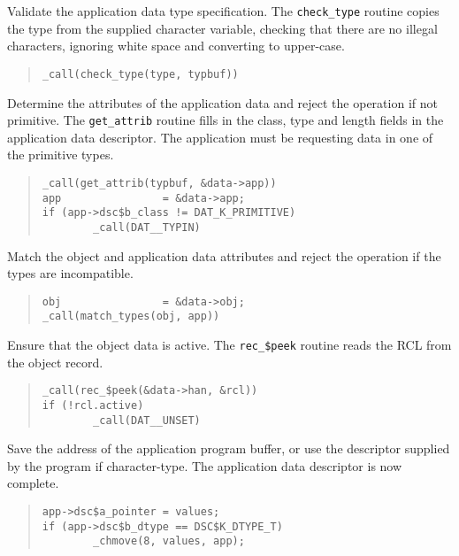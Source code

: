 Validate the application data type specification. The {\tt check\_type} routine
copies the type from the supplied character variable, checking that there are
no illegal characters, ignoring white space and converting to upper-case.

\begin {quote}
\begin {verbatim}
_call(check_type(type, typbuf))
\end{verbatim}
\end {quote}

Determine the attributes of the application data and reject the operation if
not primitive. The {\tt get\_attrib} routine fills in the class, type and length
fields in the application data descriptor. The application must be requesting
data in one of the primitive types.

\begin {quote}
\begin {verbatim}
_call(get_attrib(typbuf, &data->app))
app                = &data->app;
if (app->dsc$b_class != DAT_K_PRIMITIVE)
        _call(DAT__TYPIN)
\end{verbatim}
\end {quote}

Match the object and application data attributes and reject the operation if
the types are incompatible.

\begin {quote}
\begin {verbatim}
obj                = &data->obj;
_call(match_types(obj, app))
\end{verbatim}
\end {quote}

Ensure that the object data is active. The {\tt rec\_\$peek} routine reads the
RCL from the object record.

\begin {quote}
\begin {verbatim}
_call(rec_$peek(&data->han, &rcl))
if (!rcl.active)
        _call(DAT__UNSET)
\end{verbatim}
\end {quote}

Save the address of the application program buffer, or use the descriptor
supplied by the program if character-type. The application data descriptor is
now complete.

\begin {quote}
\begin {verbatim}
app->dsc$a_pointer = values;
if (app->dsc$b_dtype == DSC$K_DTYPE_T)
        _chmove(8, values, app);
\end{verbatim}
\end {quote}


